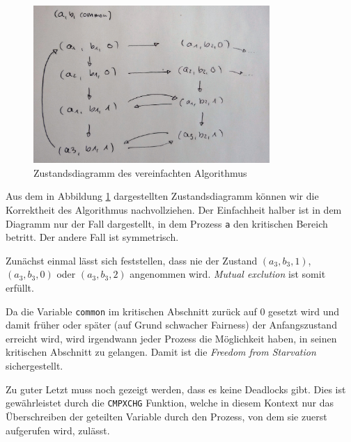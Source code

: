 \documentclass[a4paper,twoside,12pt,fleqn]{article}
\begin{document}
\begin{description}
\begin{figure}[htbp] 
  \centering
     \includegraphics[width=0.8\textwidth]{zustand.jpg}
  \caption{Zustandsdiagramm des vereinfachten Algorithmus}
  \label{zsd}
\end{figure}

Aus dem in Abbildung \ref{zsd} dargestellten Zustandsdiagramm können wir die Korrektheit des Algorithmus nachvollziehen. Der Einfachheit halber ist in dem Diagramm nur der Fall dargestellt, in dem Prozess \texttt{a} den kritischen Bereich betritt. Der andere Fall ist symmetrisch.

Zunächst einmal lässt sich feststellen, dass nie der Zustand $(a_3, b_3, 1)$, $(a_3, b_3, 0)$ oder $(a_3, b_3, 2)$ angenommen wird. \textit{Mutual exclution} ist somit erfüllt.

Da die Variable \texttt{common} im kritischen Abschnitt zurück auf $0$ gesetzt wird und damit früher oder später (auf Grund schwacher Fairness) der Anfangszustand erreicht wird, wird irgendwann jeder Prozess die Möglichkeit haben, in seinen kritischen Abschnitt zu gelangen. Damit ist die \textit{Freedom from Starvation} sichergestellt.

Zu guter Letzt muss noch gezeigt werden, dass es keine Deadlocks gibt. Dies ist gewährleistet durch die \texttt{CMPXCHG} Funktion, welche in diesem Kontext nur das Überschreiben der geteilten Variable durch den Prozess, von dem sie zuerst aufgerufen wird, zulässt.

\end{description}
\end{document}

